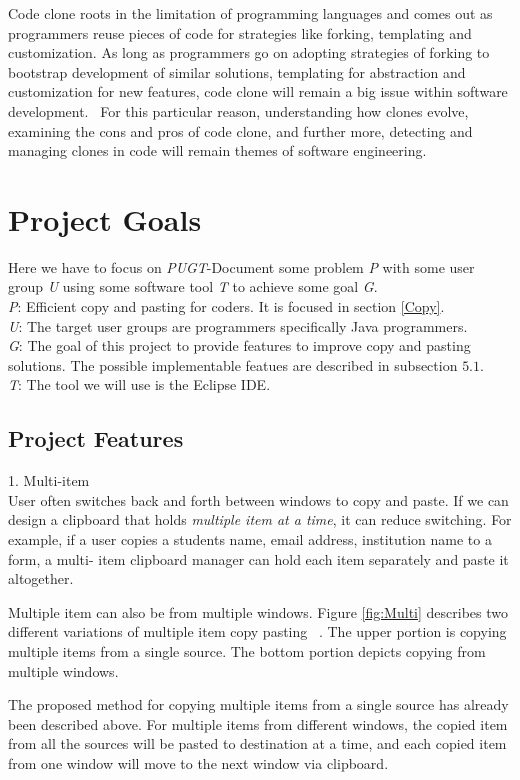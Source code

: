 \documentclass{acm_proc_article-sp}
\begin{document}
Code clone roots in the limitation of programming languages and comes out as programmers reuse pieces of code for strategies like forking, templating and customization. As long as programmers go on adopting strategies of forking to bootstrap development of similar solutions, templating for abstraction and customization for new features, code clone will remain a big issue within software development.~\cite{frontiers} For this particular reason, understanding how clones evolve, examining the cons and pros of code clone, and further more, detecting and managing clones in code will remain themes of software engineering.

\section{Project Goals}
Here we have to focus on \textit{PUGT}-Document some problem \textit{P} with some user group \textit{U} using some software tool \textit{T} to achieve some goal \textit{G}.\\
\textit{P}: Efficient copy and pasting for coders. It is focused in section \ref{Copy}.\\
\textit{U}: The target user groups are programmers specifically Java programmers.\\
\textit{G}: The goal of this project to provide features to improve copy and pasting solutions. The possible implementable featues are described in subsection $5.1$.\\
\textit{T}: The tool we will use is the Eclipse IDE.

\subsection{Project Features} 
1. Multi-item\\
 User often switches back and forth between windows to copy and paste. If we can design a clipboard that holds \textit{ multiple item at a time}, it can reduce switching. For example, if a user copies a students name, email address, institution name to a form, a multi- item clipboard manager can hold each item separately and paste it altogether.
 
 Multiple item can also be from multiple windows. Figure \ref{fig:Multi} describes two different variations of multiple item copy pasting ~\cite{cpHabits}. The upper portion is copying multiple items from a single source. The bottom portion depicts copying from multiple windows.
 
 The proposed method for copying multiple items from a single source has already been described above. For multiple items from different windows, the copied item from all the sources will be pasted to destination at a time, and each copied item from one window  will move to the next window via clipboard.
 
\end{document}
